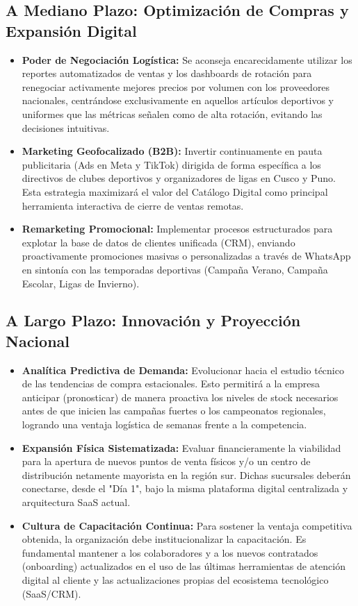 \subsection{A Mediano Plazo: Optimización de Compras y Expansión Digital}
\begin{itemize}
    \item \textbf{Poder de Negociación Logística:} Se aconseja encarecidamente utilizar los reportes automatizados de ventas y los dashboards de rotación para renegociar activamente mejores precios por volumen con los proveedores nacionales, centrándose exclusivamente en aquellos artículos deportivos y uniformes que las métricas señalen como de alta rotación, evitando las decisiones intuitivas.
    \item \textbf{Marketing Geofocalizado (B2B):} Invertir continuamente en pauta publicitaria (Ads en Meta y TikTok) dirigida de forma específica a los directivos de clubes deportivos y organizadores de ligas en Cusco y Puno. Esta estrategia maximizará el valor del Catálogo Digital como principal herramienta interactiva de cierre de ventas remotas.
    \item \textbf{Remarketing Promocional:} Implementar procesos estructurados para explotar la base de datos de clientes unificada (CRM), enviando proactivamente promociones masivas o personalizadas a través de WhatsApp en sintonía con las temporadas deportivas (Campaña Verano, Campaña Escolar, Ligas de Invierno).
\end{itemize}

\subsection{A Largo Plazo: Innovación y Proyección Nacional}
\begin{itemize}
    \item \textbf{Analítica Predictiva de Demanda:} Evolucionar hacia el estudio técnico de las tendencias de compra estacionales. Esto permitirá a la empresa anticipar (pronosticar) de manera proactiva los niveles de stock necesarios antes de que inicien las campañas fuertes o los campeonatos regionales, logrando una ventaja logística de semanas frente a la competencia.
    \item \textbf{Expansión Física Sistematizada:} Evaluar financieramente la viabilidad para la apertura de nuevos puntos de venta físicos y/o un centro de distribución netamente mayorista en la región sur. Dichas sucursales deberán conectarse, desde el "Día 1", bajo la misma plataforma digital centralizada y arquitectura SaaS actual.
    \item \textbf{Cultura de Capacitación Continua:} Para sostener la ventaja competitiva obtenida, la organización debe institucionalizar la capacitación. Es fundamental mantener a los colaboradores y a los nuevos contratados (onboarding) actualizados en el uso de las últimas herramientas de atención digital al cliente y las actualizaciones propias del ecosistema tecnológico (SaaS/CRM).
\end{itemize}
